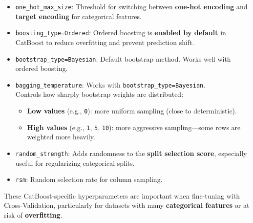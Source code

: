 \documentclass[
  letterpaper,
  DIV=11,
  numbers=noendperiod]{scrreprt}
\providecommand{\tightlist}{%
  \setlength{\itemsep}{0pt}\setlength{\parskip}{0pt}}\usepackage{longtable,booktabs,array}
\begin{document}
\begin{itemize}
\item
  \texttt{one\_hot\_max\_size}: Threshold for switching between
  \textbf{one-hot encoding} and \textbf{target encoding} for categorical
  features.
\item
  \texttt{boosting\_type=\textquotesingle{}Ordered\textquotesingle{}}:
  Ordered boosting is \textbf{enabled by default} in CatBoost to reduce
  overfitting and prevent prediction shift.
\item
  \texttt{bootstrap\_type=\textquotesingle{}Bayesian\textquotesingle{}}:
  Default bootstrap method. Works well with ordered boosting.
\item
  \texttt{bagging\_temperature}: Works with
  \texttt{bootstrap\_type=\textquotesingle{}Bayesian\textquotesingle{}}.\\
  Controls how sharply bootstrap weights are distributed:

  \begin{itemize}
  \tightlist
  \item
    \textbf{Low values} (e.g., \texttt{0}): more uniform sampling (close
    to deterministic).
  \item
    \textbf{High values} (e.g., \texttt{1}, \texttt{5}, \texttt{10}):
    more aggressive sampling---some rows are weighted more heavily.
  \end{itemize}
\item
  \texttt{random\_strength}: Adds randomness to the \textbf{split
  selection score}, especially useful for regularizing categorical
  splits.
\item
  \texttt{rsm}: Random selection rate for column sampling.
\end{itemize}

These CatBoost-specific hyperparameters are important when fine-tuning
with Cross-Validation, particularly for datasets with many
\textbf{categorical features} or at risk of \textbf{overfitting}.
\end{document}
